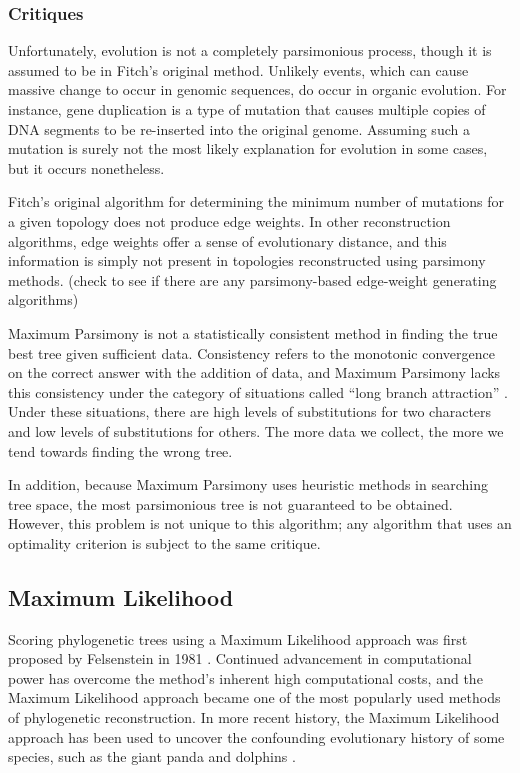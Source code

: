 \documentclass[10pt,twocolumn]{article}
\begin{document}
\subsubsection*{Critiques}
Unfortunately, evolution is not a completely parsimonious process, though it is assumed to be in Fitch's original method. Unlikely events, which can cause massive change to occur in genomic sequences, do occur in organic evolution. For instance, gene duplication is a type of mutation that causes multiple copies of DNA segments to be re-inserted into the original genome. Assuming such a mutation is surely not the most likely explanation for evolution in some cases, but it occurs nonetheless.

Fitch's original algorithm for determining the minimum number of mutations for a given topology does not produce edge weights. In other reconstruction algorithms, edge weights offer a sense of evolutionary distance, and this information is simply not present in topologies reconstructed using parsimony methods. (check to see if there are any parsimony-based edge-weight generating algorithms)

Maximum Parsimony is not a statistically consistent method in finding the true best tree given sufficient data. Consistency refers to the monotonic convergence on the correct answer with the addition of data, and Maximum Parsimony lacks this consistency under the category of situations called ``long branch attraction'' \cite{felsenstein1978cases}. Under these situations, there are high levels of substitutions for two characters and low levels of substitutions for others. The more data we collect, the more we tend towards finding the wrong tree.

In addition, because Maximum Parsimony uses heuristic methods in searching tree space, the most parsimonious tree is not guaranteed to be obtained. However, this problem is not unique to this algorithm; any algorithm that uses an optimality criterion is subject to the same critique.

\subsection*{Maximum Likelihood}
Scoring phylogenetic trees using a Maximum Likelihood approach was first proposed by Felsenstein in 1981 \cite{felsenstein1981evolutionary}. Continued advancement in computational power has overcome the method's inherent high computational costs, and the Maximum Likelihood approach became one of the most popularly used methods of phylogenetic reconstruction. In more recent history, the Maximum Likelihood approach has been used to uncover the confounding evolutionary history of some species, such as the giant panda and dolphins \cite{yang2009bayesian,peng2007complete}. 
\end{document}
